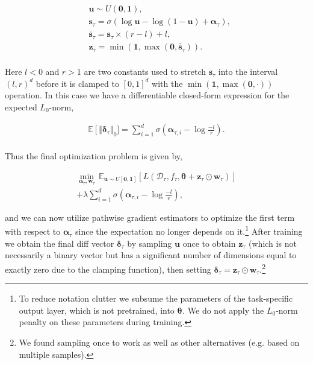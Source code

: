 \begin{align*}
&\mathbf{u} \sim U(\mathbf{0}, \mathbf{1}),\\
   & \mathbf{s}_\tau = \sigma\left(\log \mathbf{u} - \log (1-\mathbf{u}) + \boldsymbol{\alpha}_\tau\right), \\
   & \bar{\mathbf{s}}_\tau = \mathbf{s}_\tau \times (r -l) + l, \\
   &\mathbf{z}_\tau = \min(\mathbf{1}, \max(\mathbf{0}, \bar{\mathbf{s}}_\tau)).  \\[-6mm]
\end{align*}

Here $l < 0$ and $r > 1$ are two constants used to stretch $\mathbf{s}_\tau$ into the interval $(l, r)^d$ before it is clamped to $[0, 1]^d$ with the $\min(\mathbf{1}, \max(\mathbf{0}, \cdot))$ operation. In this case we have a differentiable closed-form expression for the expected $L_0$-norm,

\begin{align*}
    \mathbb{E}\left[\Vert \boldsymbol{\delta}_\tau \right \Vert_0] =

    \sum_{i=1}^d \sigma\left(\boldsymbol{\alpha}_{\tau,i} - \log \frac{-l}{r} \right).\\[-6mm]
\end{align*}

Thus the final optimization problem is given by,

\begin{align*}
    \min_{\boldsymbol{\alpha}_\tau, \mathbf{w}_\tau}\, \mathbb{E}_{\mathbf{u} \sim U[\mathbf{0}, \mathbf{1}]}\left[  L(\mathcal{D}_\tau, f_\tau, \boldsymbol{\theta}_\text{} + \mathbf{z}_\tau \odot \mathbf{w}_\tau) \right] 
    \\ +  \lambda \sum_{i=1}^d \sigma\left(\boldsymbol{\alpha}_{\tau,i} - \log \frac{-l}{r} \right) ,
\end{align*}

 
and we can now utilize pathwise gradient estimators to optimize the first term with respect to $\boldsymbol{\alpha}_\tau$ since the expectation no longer depends on it.\footnote{To reduce notation clutter we subsume the parameters of the task-specific output layer, which is not pretrained, into $\boldsymbol{\theta}_\text{}$. We do not apply the $L_0$-norm penalty on these parameters during training.} After training we obtain the final diff vector $\boldsymbol{\delta}_\tau$ by sampling $\mathbf{u}$ once to obtain $\mathbf{z}_\tau$ (which is not necessarily a binary vector but has a significant number of dimensions equal to exactly zero due to the clamping function), then setting $\boldsymbol{\delta}_\tau = \mathbf{z}_\tau \odot \mathbf{w}_\tau$.\footnote{We found sampling once to work as well as other alternatives (e.g. based on multiple samples).} 

